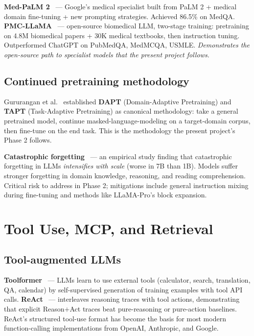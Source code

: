 \documentclass[11pt]{article}
\begin{document}
\textbf{Med-PaLM 2}~\cite{singhal2023medpalm2} --- Google's medical specialist built from PaLM 2 + medical domain fine-tuning + new prompting strategies. Achieved 86.5\% on MedQA. \textbf{PMC-LLaMA}~\cite{wu2023pmcllama} --- open-source biomedical LLM, two-stage training: pretraining on 4.8M biomedical papers + 30K medical textbooks, then instruction tuning. Outperformed ChatGPT on PubMedQA, MedMCQA, USMLE. \emph{Demonstrates the open-source path to specialist models that the present project follows.}

\subsection{Continued pretraining methodology}

Gururangan et al.~\cite{gururangan2020dontstop} established \textbf{DAPT} (Domain-Adaptive Pretraining) and \textbf{TAPT} (Task-Adaptive Pretraining) as canonical methodology: take a general pretrained model, continue masked-language-modeling on a target-domain corpus, then fine-tune on the end task. This is the methodology the present project's Phase 2 follows.

\textbf{Catastrophic forgetting}~\cite{luo2023catastrophic} --- an empirical study finding that catastrophic forgetting in LLMs \emph{intensifies with scale} (worse in 7B than 1B). Models suffer stronger forgetting in domain knowledge, reasoning, and reading comprehension. Critical risk to address in Phase 2; mitigations include general instruction mixing during fine-tuning and methods like LLaMA-Pro's block expansion.

\section{Tool Use, MCP, and Retrieval}

\subsection{Tool-augmented LLMs}

\textbf{Toolformer}~\cite{schick2023toolformer} --- LLMs learn to use external tools (calculator, search, translation, QA, calendar) by self-supervised generation of training examples with tool API calls. \textbf{ReAct}~\cite{yao2023react} --- interleaves reasoning traces with tool actions, demonstrating that explicit Reason$+$Act traces beat pure-reasoning or pure-action baselines. ReAct's structured tool-use format has become the basis for most modern function-calling implementations from OpenAI, Anthropic, and Google.
\end{document}
